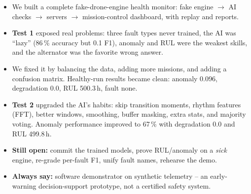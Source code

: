\documentclass[11pt]{article}
\begin{document}
\begin{itemize}[nosep]
  \item We built a complete fake-drone-engine health monitor: fake engine
        $\rightarrow$ AI checks $\rightarrow$ servers $\rightarrow$
        mission-control dashboard, with replay and reports.
  \item \textbf{Test 1} exposed real problems: three fault types never
        trained, the AI was ``lazy'' (86\,\% accuracy but 0.1 F1), anomaly
        and RUL were the weakest skills, and the alternator was the
        favorite wrong answer.
  \item We fixed it by balancing the data, adding more missions, and
        adding a confusion matrix. Healthy-run results became clean:
        anomaly 0.096, degradation 0.0, RUL 500.3\,h, fault none.
  \item \textbf{Test 2} upgraded the AI's habits: skip transition moments,
        rhythm features (FFT), better windows, smoothing, buffer masking,
        extra stats, and majority voting. Anomaly performance improved to
        67\,\% with degradation 0.0 and RUL 499.8\,h.
  \item \textbf{Still open:} commit the trained models, prove RUL/anomaly
        on a \emph{sick} engine, re-grade per-fault F1, unify fault names,
        rehearse the demo.
  \item \textbf{Always say:} software demonstrator on synthetic telemetry
        -- an early-warning decision-support prototype, not a certified
        safety system.
\end{itemize}
\end{document}
